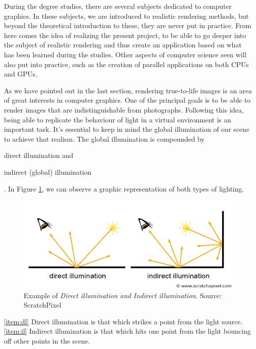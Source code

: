 \documentclass[titlepage,12pt]{report}
\begin{document}
During the degree studies, there are several subjects dedicated to computer graphics. In these subjects, we are introduced to realistic rendering methods, but beyond the theoretical introduction to these, they are never put in practice. From here comes the idea of realizing the present project, to be able to go deeper into the subject of realistic rendering and thus create an application based on what has been learned during the studies. Other aspects of computer science seen will also put into practice, such as the creation of parallel applications on both CPUs and GPUs.

As we have pointed out in the last section, rendering true-to-life images is an area of great interests in computer graphics. One of the principal goals is to be able to render images that are indistinguishable from photographs. Following this idea, being able to replicate the behaviour of light in a virtual environment is an important task. It's essential to keep in mind the global illumination of our scene to achieve that realism. The global illumination is compounded by \begin{enumerate*}[label=\roman*)] \item direct illumination \label{item:dl} and \item indirect (global) illumination \label{item:il} \end{enumerate*}. In Figure \ref{globalil}, we can observe a graphic representation of both types of lighting.

\begin{figure}[!ht]
	\centering
	\includegraphics[scale=0.45]{media/shad2-globalillum3.png}
	\caption{Example of \textit{Direct illumination and Indirect illumination}. Source: ScratchPixel}
	\label{globalil}
\end{figure}

\ref{item:dl} Direct illumination is that which strikes a point from the light source.\\
\ref{item:il} Indirect illumination is that which hits one point from the light bouncing off other points in the scene.
\end{document}

